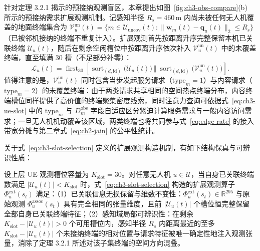 针对定理 3.2.1 揭示的预接纳观测盲区，本章提出如图~\ref{fig:ch3-obs-compare}(b) 所示的预接纳需求扩展观测机制。记感知半径 $R_s=460\,\mathrm{m}$ 内尚未被任何无人机覆盖的地面终端集合为 $\mathcal{V}_u^{\mathrm{un}}(t)=\{m\in\mathcal{U}_{\mathrm{uncov}}(t):\|\mathbf{w}_m(t)-\mathbf{q}_u(t)\|_2\leq R_s\}$（已被邻机接纳的终端不重复计入）。扩展观测首先按距离升序完整保留本机已关联终端 $\mathcal{U}_u(t)$，随后在剩余空闲槽位中按距离升序依次补入 $\mathcal{V}_u^{\mathrm{un}}(t)$ 中的未覆盖终端，直至填满 $30$ 槽（不足部分补零）：
\begin{equation}
 \mathcal L_u(t)=
 \operatorname{first}_{30}\left[
 \operatorname{sort}_{(d,\mathrm{id})}\big(\mathcal U_u(t)\big)
 \ \Vert\ 
 \operatorname{sort}_{(d,\mathrm{id})}\big(\mathcal V_u^{\mathrm{un}}(t)\big)\right].
 \label{eq:ch3-slot-selection}
\end{equation}
值得注意的是，$\mathcal{V}_u^{\mathrm{un}}(t)$ 同时包含当步发起服务请求（$\mathrm{type}_m=1$）与内容请求（$\mathrm{type}_m=2$）的未覆盖终端：由于两类请求共享相同的空间热点终端分布，内容终端槽位同样提供了高价值的终端聚集密度线索，同时注意力查询可依据式~\eqref{eq:ch3-ue-slot} 中的 $\mathrm{type}_m$ 与 $D_m^{\mathrm{obs}}$ 字段自适应区分紧迫计算服务需求与一般内容访问需求；一旦无人机机动覆盖该区域，两类终端也将共同参与式~\eqref{eq:edge-rate} 的接入带宽分摊与第二章式~\eqref{eq:ch2-jain} 的公平性统计。

关于式~\eqref{eq:ch3-slot-selection} 定义的扩展观测构造机制，有如下结构保真与可辨识性质：

\begin{lemma}[按距离排序扩展观测的维数不变性与感知域可辨识性]
设上层 UE 观测槽位容量为 $K_{\mathrm{slot}}=30$。对任意无人机 $u\in\mathcal{U}$，当自身已关联终端数满足 $|\mathcal{U}_u(t)|<K_{\mathrm{slot}}$ 时，式~\eqref{eq:ch3-slot-selection} 构造的扩展观测算子 $\Phi_u^{\mathrm{ext}}(s_t)$ 满足：（1）已关联信息无损保留与维数不变性：$\Phi_u^{\mathrm{ext}}(s_t)\in\mathbb{R}^{295}$ 与原始观测 $\Phi_u^{\mathrm{assoc}}(s_t)$ 具有完全相同的张量维度，且前 $|\mathcal{U}_u(t)|$ 个槽位恒完整保留全部自身已关联终端特征；（2）感知域局部可辨识性：在剩余 $K_{\mathrm{slot}}-|\mathcal{U}_u(t)|>0$ 个可用槽位内，感知半径 $R_s$ 内距离最近的至多 $K_{\mathrm{slot}}-|\mathcal{U}_u(t)|$ 个未接纳终端的相对位置与请求特征被唯一确定性地注入观测张量，消除了定理 3.2.1 所述对该子集终端的空间方向混叠。
\end{lemma}

